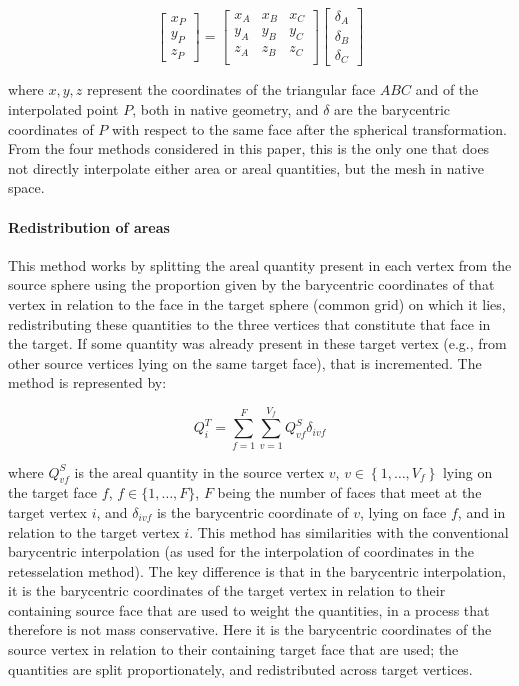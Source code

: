 $$
\left[
\begin{array}{c}
x_{P} \\
y_{P} \\
z_{P}
\end{array} \right] = \left[
\begin{array}{ccc}
x_{A} & x_{B} & x_{C} \\
y_{A} & y_{B} & y_{C} \\
z_{A} & z_{B} & z_{C} \\
\end{array}
\right] \left[
\begin{array}{c}
\delta_{A} \\
\delta_{B} \\
\delta_{C}
\end{array} \right]
$$

\noindent
where $x,y,z$ represent the coordinates of the triangular face $ABC$ and of the interpolated point $P$, both in native geometry, and $\delta$ are the barycentric coordinates of $P$ with respect to the same face after the spherical transformation. From the four methods considered in this paper, this is the only one that does not directly interpolate either area or areal quantities, but the mesh in native space.

\paragraph{Redistribution of areas}

This method works by splitting the areal quantity present in each vertex from the source sphere using the proportion given by the barycentric coordinates of that vertex in relation to the face in the target sphere (common grid) on which it lies, redistributing these quantities to the three vertices that constitute that face in the target. If some quantity was already present in these target vertex (e.g., from other source vertices lying on the same target face), that is incremented. The method is represented by:

$$
Q^T_i = \sum_{f=1}^F\sum_{v=1}^{V_f} Q^S_{vf}\delta_{ivf}
$$

\noindent
where $Q^S_{vf}$ is the areal quantity in the source vertex $v$, $v\in\left\{1, \ldots, V_f \right\}$ lying on the target face $f$, $f\in\{1,\ldots,F\}$, $F$ being the number of faces that meet at the target vertex $i$, and $\delta_{ivf}$ is the barycentric coordinate of $v$, lying on face $f$, and in relation to the target vertex $i$. This method has similarities with the conventional barycentric interpolation (as used for the interpolation of coordinates in the retesselation method). The key difference is that in the barycentric interpolation, it is the barycentric coordinates of the target vertex in relation to their containing source face that are used to weight the quantities, in a process that therefore is not mass conservative. Here it is the barycentric coordinates of the source vertex in relation to their containing target face that are used; the quantities are split proportionately, and redistributed across target vertices.

